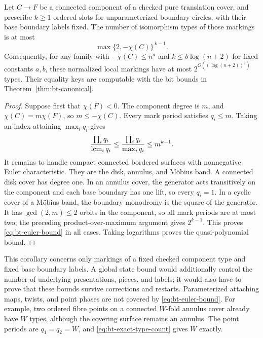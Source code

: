 \begin{corollary}\label{cor:bt-genus-bound}
Let $C\to F$ be a connected component of a checked pure translation cover,
and prescribe $k\ge1$ ordered slots for unparameterized boundary circles,
with their base boundary labels fixed.  The number of isomorphism types
of those markings is at most
\begin{equation}\label{eq:bt-euler-bound}
 \max\{2,-\chi(C)\}^{\,k-1}.
\end{equation}
Consequently, for any family with $-\chi(C)\le n^a$ and
$k\le b\log(n+2)$ for fixed constants $a,b$, these normalized local
markings have at most $2^{O((\log(n+2))^2)}$ types.  Their equality keys
are computable with the bit bounds in Theorem~\ref{thm:bt-canonical}.
\end{corollary}
\begin{proof}
Suppose first that $\chi(F)<0$.  The component degree is $m$, and
$\chi(C)=m\chi(F)$, so $m\le-\chi(C)$.  Every mark period satisfies
$q_i\le m$.  Taking an index attaining $\max_iq_i$ gives
\[
 \frac{\prod_iq_i}{\operatorname{lcm}_iq_i}
 \le \frac{\prod_iq_i}{\max_iq_i}
 \le m^{k-1}.
\]
It remains to handle compact connected bordered surfaces with
nonnegative Euler characteristic.  They are the disk, annulus, and
M\"obius band.  A connected disk cover has degree one.  In an annulus
cover, the generator acts transitively on the component and each base
boundary has one lift, so every $q_i=1$.  In a cyclic cover of a
M\"obius band, the boundary monodromy is the square of the generator.
It has $\gcd(2,m)\le2$ orbits in the component, so all mark periods are
at most two; the preceding product-over-maximum argument gives
$2^{k-1}$.  This proves \eqref{eq:bt-euler-bound} in all cases.
Taking logarithms proves the quasi-polynomial bound.
\end{proof}

This corollary concerns only markings of a fixed checked component type
and fixed base boundary labels.  A global state bound would additionally
control the number of underlying presentations, pieces, and labels; it
would also have to prove that these bounds survive corrections and
restarts.  Parameterized attaching maps, twists, and point phases are
not covered by \eqref{eq:bt-euler-bound}.  For example, two ordered fibre
points on a connected $W$-fold annulus cover already have $W$ types,
although the covering surface remains an annulus.  The point periods are
$q_1=q_2=W$, and \eqref{eq:bt-exact-type-count} gives $W$ exactly.

